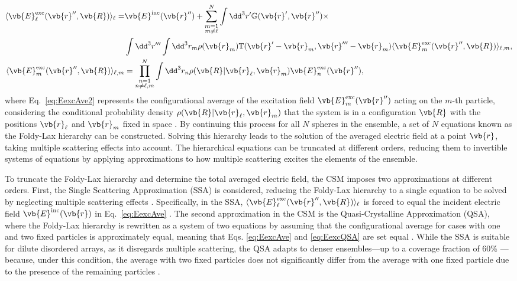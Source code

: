 %
\begin{subequations}%
	\begin{align}%
		\langle \vb{E}_\ell^\text{exc}(\vb{r}'',\vb{R})\rangle_\ell =& \vb{E}^\text{inc}(\vb{r}'')
		+ \sum_{\substack{m =1 \\ m\neq \ell}}^N  \int\dd^3 r' \mathbb{G}(\vb{r}',\vb{r}'') \times \notag\\
		& \int\dd^3 r'''\int \dd^3 r_m \rho(\vb{r}_m) \mathbb{T}(\vb{r}'-\vb{r}_m,\vb{r}'''-\vb{r}_m) \langle \vb{E}_m^\text{exc}(\vb{r}'',\vb{R})\rangle_{\ell,m},
		\\
		\langle \vb{E}_m^\text{exc}(\vb{r}'',\vb{R})\rangle_{\ell,m}
		&= \prod_{\substack{n =1 \\ n\neq \ell,m}}^N  \int\dd^3 r_n \rho(\vb{R}|\vb{r}_\ell,\vb{r}_m) \vb{E}^\text{exc}_n(\vb{r}''),
		\label{eq:EexcAve2}
	\end{align}%
	\label{eq:EexcQSA}%
\end{subequations}%
%
where Eq.~\eqref{eq:EexcAve2} represents the configurational average of the excitation field $ \vb{E}_m^\text{exc}(\vb{r}'')$ acting on the $m$-th particle, considering the conditional probability density $\rho(\vb{R}|\vb{r}_\ell,\vb{r}_m)$ that the system is in a configuration $\vb{R}$ with the positions $\vb{r}_\ell$ and $\vb{r}_m$ fixed in space \cite{garcia2012multiple,barrera_coherent_2003}. By continuing this process for all $N$ spheres in the ensemble, a set of $N$ equations known as the Foldy-Lax hierarchy \cite{loiko_monolayers_1998} can be constructed. Solving this hierarchy leads to the solution of the averaged electric field at a point $\vb{r}$, taking multiple scattering effects into account. The hierarchical equations can be truncated at different orders, reducing them to invertible systems of equations by applying approximations to how multiple scattering excites the elements of the ensemble.

To truncate the Foldy-Lax hierarchy and determine the total averaged electric field, the CSM imposes two approximations at different orders. First, the Single Scattering Approximation (SSA) is considered, reducing the Foldy-Lax hierarchy to a single equation to be solved by neglecting multiple scattering effects \cite{barrera_coherent_2003}. Specifically, in the SSA, $\langle\vb{E}_\ell^\text{exc}(\vb{r}'',\vb{R})\rangle_\ell$ is forced to equal the incident electric field $\vb{E}^\text{inc}(\vb{r})$ in Eq.~\eqref{eq:EexcAve} \cite{loiko_monolayers_1998,garcia2012multiple}. The second approximation in the CSM is the Quasi-Crystalline Approximation (QSA), where the Foldy-Lax hierarchy is rewritten as a system of two equations by assuming that the configurational average for cases with one and two fixed particles is approximately equal, meaning that Eqs. \eqref{eq:EexcAve} and \eqref{eq:EexcQSA} are set equal \cite{loiko_monolayers_1998,barrera_coherent_2003}. While the SSA is suitable for dilute disordered arrays, as it disregards multiple scattering, the QSA adapts to denser ensembles---up to a coverage fraction of 60\% \cite{loiko_monolayers_1998}---because, under this condition, the average with two fixed particles does not significantly differ from the average with one fixed particle due to the presence of the remaining particles \cite{barrera_coherent_2003}.

